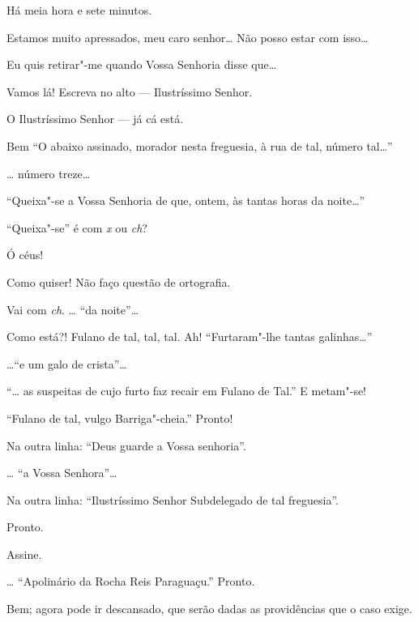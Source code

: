   Há meia hora e sete minutos.

 Estamos muito apressados, meu caro senhor\ldots{} Não posso estar
com isso\ldots{}

 Eu quis retirar"-me quando Vossa Senhoria disse que\ldots{}

 Vamos lá! Escreva no alto --- Ilustríssimo Senhor.

 O Ilustríssimo Senhor --- já cá está.

 Bem  “O abaixo assinado, morador nesta
freguesia, à rua de tal, número tal\ldots{}”

  \ldots{} número treze\ldots{}

 “Queixa"-se a Vossa Senhoria de que, ontem, às tantas horas da
noite\ldots{}”

 “Queixa"-se” é com \textit{x} ou \textit{ch}?

 Ó céus! 

 Como quiser! Não faço questão de ortografia.

 Vai com \textit{ch}. \ldots{} “da noite”\ldots{}

 Como está?!  Fulano de tal, tal, tal. Ah!
 “Furtaram"-lhe tantas galinhas\ldots{}”

  \ldots{}``e um galo de crista”\ldots{}

 “\ldots{} as suspeitas de cujo furto faz recair em Fulano de Tal.”
 E metam"-se!

  “Fulano de tal, vulgo
Barriga"-cheia.” Pronto!

 Na outra linha: “Deus guarde a Vossa senhoria”.

 \ldots{} “a Vossa Senhora”\ldots{}

 Na outra linha: “Ilustríssimo Senhor Subdelegado de tal
freguesia”.

 Pronto.

 Assine.

 \ldots{} “Apolinário da Rocha Reis Paraguaçu.”
 Pronto.

 Bem; agora pode ir descansado, que serão dadas as providências
que o caso exige.

